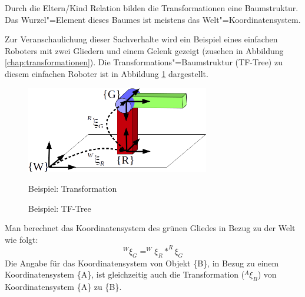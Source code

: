 Durch die Eltern/Kind Relation bilden die Transformationen eine Baumstruktur.
Das Wurzel"=Element dieses Baumes ist meistens das Welt"=Koordinatensystem.


Zur Veranschaulichung dieser Sachverhalte wird ein Beispiel eines einfachen Roboters mit zwei Gliedern und einem Gelenk gezeigt (zusehen in Abbildung \ref{chap:transformationen}).
Die Transformations"=Baumstruktur (TF-Tree) zu diesem einfachen Roboter ist in Abbildung \ref{Ab:tf-tree} dargestellt.

\begin{figure}[ht!]
\begin{minipage}{0.48\textwidth}
	\centering
	\includegraphics[width=8cm]{images/Transformation.png}
	\caption{Beispiel: Transformation}
	\label{Ab:transformation}
\end{minipage}
\begin{minipage}{0.48\textwidth}
\centering
{}
	\caption{Beispiel: TF-Tree}
	\label{Ab:tf-tree}

\end{minipage}
\end{figure}

Man berechnet das Koordinatensystem des grünen Gliedes in Bezug zu der Welt wie folgt:
\begin{equation}
^{W}\xi_{G} = ^{W}\xi_{R} * ^{R}\xi_{G}
\end{equation}
Die Angabe für das Koordinatensystem von Objekt \{B\}, in Bezug zu einem Koordinatensystem \{A\}, ist gleichzeitig auch die Transformation ($^{A}\xi_{B}$) von Koordinatensystem \{A\} zu \{B\}.

